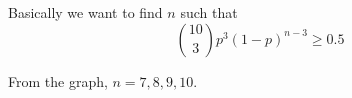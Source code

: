 
Basically we want to find $n$ such that 
\[
\binom{10}{3}p^3(1-p)^{n-3}  \geq 0.5
\]



From the graph, $n = 7, 8, 9, 10$.
